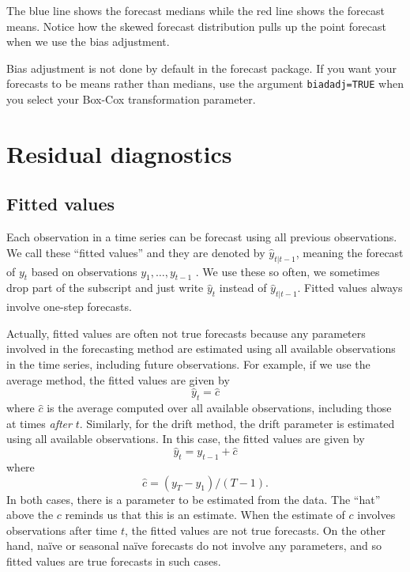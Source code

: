 \documentclass[]{book}
\begin{document}
The blue line shows the forecast medians while the red line shows the forecast means. Notice how the skewed forecast distribution pulls up the point forecast when we use the bias adjustment.

Bias adjustment is not done by default in the forecast package. If you want your forecasts to be means rather than medians, use the argument \texttt{biadadj=TRUE} when you select your Box-Cox transformation parameter.

\hypertarget{residuals}{%
\section{Residual diagnostics}\label{residuals}}

\hypertarget{fitted-values}{%
\subsection*{Fitted values}\label{fitted-values}}

Each observation in a time series can be forecast using all previous observations. We call these ``fitted values'' and they are denoted by \(\hat{y}_{t|t-1}\), meaning the forecast of \(y_t\) based on observations \(y_{1},\dots,y_{t-1}\) . We use these so often, we sometimes drop part of the subscript and just write \(\hat{y}_t\) instead of \(\hat{y}_{t|t-1}\). Fitted values always involve one-step forecasts.

Actually, fitted values are often not true forecasts because any parameters involved in the forecasting method are estimated using all available observations in the time series, including future observations. For example, if we use the average method, the fitted values are given by
\[
  \hat{y}_t = \hat{c}
\]
where \(\hat{c}\) is the average computed over all available observations, including those at times \emph{after} \(t\). Similarly, for the drift method, the drift parameter is estimated using all available observations. In this case, the fitted values are given by
\[
 \hat{y}_t = y_{t-1} + \hat{c}
\]
where
\[
  \hat{c} = (y_T-y_1)/(T-1).
\]
In both cases, there is a parameter to be estimated from the data. The ``hat'' above the \(c\) reminds us that this is an estimate. When the estimate of \(c\) involves observations after time \(t\), the fitted values are not true forecasts. On the other hand, naïve or seasonal naïve forecasts do not involve any parameters, and so fitted values are true forecasts in such cases.
\end{document}
